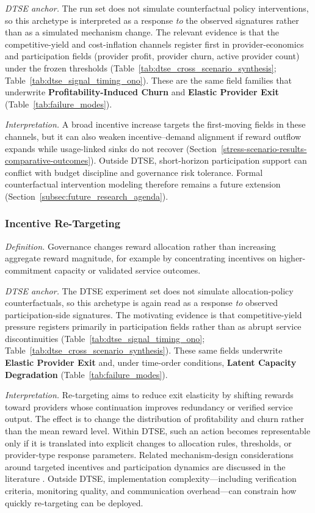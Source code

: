\emph{DTSE anchor.} The run set does not simulate counterfactual policy interventions, so this archetype is interpreted as a response \emph{to} the observed signatures rather than as a simulated mechanism change. The relevant evidence is that the competitive-yield and cost-inflation channels register first in provider-economics and participation fields (provider profit, provider churn, active provider count) under the frozen thresholds (Table~\ref{tab:dtse_cross_scenario_synthesis}; Table~\ref{tab:dtse_signal_timing_ono}). These are the same field families that underwrite \textbf{Profitability-Induced Churn} and \textbf{Elastic Provider Exit} (Table~\ref{tab:failure_modes}).

\emph{Interpretation.} A broad incentive increase targets the first-moving fields in these channels, but it can also weaken incentive--demand alignment if reward outflow expands while usage-linked sinks do not recover (Section~\ref{stress-scenario-results-comparative-outcomes}). Outside DTSE, short-horizon participation support can conflict with budget discipline and governance risk tolerance. Formal counterfactual intervention modeling therefore remains a future extension (Section~\ref{subsec:future_research_agenda}).

\subsubsection*{Incentive Re-Targeting}
\emph{Definition.} Governance changes reward allocation rather than increasing aggregate reward magnitude, for example by concentrating incentives on higher-commitment capacity or validated service outcomes.

\emph{DTSE anchor.} The DTSE experiment set does not simulate allocation-policy counterfactuals, so this archetype is again read as a response \emph{to} observed participation-side signatures. The motivating evidence is that competitive-yield pressure registers primarily in participation fields rather than as abrupt service discontinuities (Table~\ref{tab:dtse_signal_timing_ono}; Table~\ref{tab:dtse_cross_scenario_synthesis}). These same fields underwrite \textbf{Elastic Provider Exit} and, under time-order conditions, \textbf{Latent Capacity Degradation} (Table~\ref{tab:failure_modes}).

\emph{Interpretation.} Re-targeting aims to reduce exit elasticity by shifting rewards toward providers whose continuation improves redundancy or verified service output. The effect is to change the distribution of profitability and churn rather than the mean reward level. Within DTSE, such an action becomes representable only if it is translated into explicit changes to allocation rules, thresholds, or provider-type response parameters. Related mechanism-design considerations around targeted incentives and participation dynamics are discussed in the literature \cite{Tan2020, Chiu2024}. Outside DTSE, implementation complexity---including verification criteria, monitoring quality, and communication overhead---can constrain how quickly re-targeting can be deployed.


